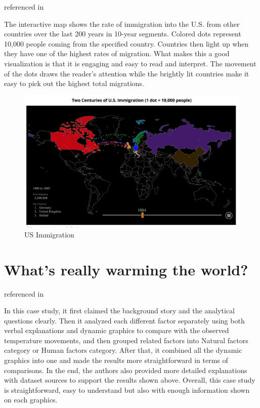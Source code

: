 \documentclass[]{book}
\theoremstyle{definition}
\theoremstyle{definition}
\theoremstyle{definition}
\theoremstyle{remark}
\begin{document}
\citep{Immigration} referenced in \citep{cool_data}

The interactive map shows the rate of immigration into the U.S. from
other countries over the last 200 years in 10-year segments. Colored
dots represent 10,000 people coming from the specified country.
Countries then light up when they have one of the highest rates of
migration. What makes this a good visualization is that it is engaging
and easy to read and interpret. The movement of the dots draws the
reader's attention while the brightly lit countries make it easy to pick
out the highest total migrations.

\begin{figure}
\centering
\includegraphics{images/immigration.png}
\caption{US Immigration}
\end{figure}

\section{What's really warming the
world?}\label{whats-really-warming-the-world}

\citep{world_warming} referenced in \citep{int_viz_1}

In this case study, it first claimed the background story and the
analytical questions clearly. Then it analyzed each different factor
separately using both verbal explanations and dynamic graphics to
compare with the observed temperature movements, and then grouped
related factors into Natural factors category or Human factors category.
After that, it combined all the dynamic graphics into one and made the
results more straightforward in terms of comparisons. In the end, the
authors also provided more detailed explanations with dataset sources to
support the results shown above. Overall, this case study is
straightforward, easy to understand but also with enough information
shown on each graphics.
\end{document}
